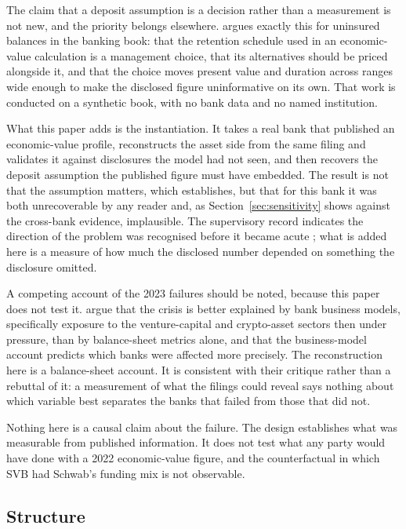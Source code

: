 The claim that a deposit assumption is a decision rather than a measurement is not
new, and the priority belongs elsewhere. \citet{Chen2026} argues exactly this for
uninsured balances in the banking book: that the retention schedule used in an
economic-value calculation is a management choice, that its alternatives should be
priced alongside it, and that the choice moves present value and duration across
ranges wide enough to make the disclosed figure uninformative on its own. That work
is conducted on a synthetic book, with no bank data and no named institution.

What this paper adds is the instantiation. It takes a real bank that published an
economic-value profile, reconstructs the asset side from the same filing and
validates it against disclosures the model had not seen, and then recovers the
deposit assumption the published figure must have embedded. The result is not that
the assumption matters, which \citet{Chen2026} establishes, but that for this bank it
was both unrecoverable by any reader and, as Section~\ref{sec:sensitivity} shows
against the cross-bank evidence, implausible. The supervisory record indicates the
direction of the problem was recognised before it became acute \citep{FRB2023}; what
is added here is a measure of how much the disclosed number depended on something the
disclosure omitted.

A competing account of the 2023 failures should be noted, because this paper does not
test it. \citet{KellyRose2025} argue that the crisis is better explained by bank
business models, specifically exposure to the venture-capital and crypto-asset
sectors then under pressure, than by balance-sheet metrics alone, and that the
business-model account predicts which banks were affected more precisely. The
reconstruction here is a balance-sheet account. It is consistent with their critique
rather than a rebuttal of it: a measurement of what the filings could reveal says
nothing about which variable best separates the banks that failed from those that did
not.

Nothing here is a causal claim about the failure. The design establishes what was
measurable from published information. It does not test what any party would have done
with a 2022 economic-value figure, and the counterfactual in which SVB had Schwab's
funding mix is not observable.

\subsection{Structure}


